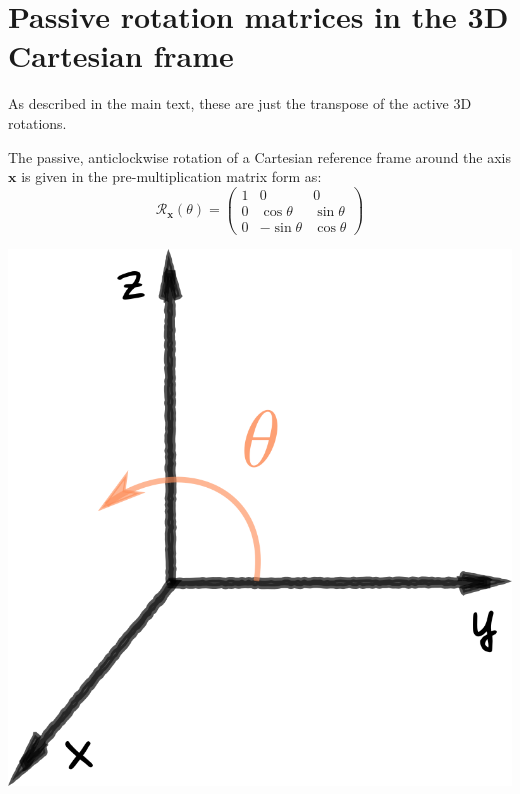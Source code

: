 \chapter{Passive rotation matrices in the 3D Cartesian frame}
\label{Chap:rotations}

As described in the  main text, these are just the transpose of the active 3D rotations.

\vspace{0.2cm}

\noindent\begin{minipage}{0.47\textwidth}
The passive, anticlockwise rotation of a Cartesian reference frame around the axis $\mathbf{x}$ is given in the pre-multiplication matrix form as: 
\begin{equation*}
\mathcal{R}_\mathbf{x}(\theta)=\begin{pmatrix}
1 &  0           & 0 \\
0 & \cos{\theta} & \sin{\theta} \\
0 & -\sin{\theta} & \cos{\theta}
\end{pmatrix}
\label{eq:RotMat}
\end{equation*}
\end{minipage}
\begin{minipage}{0.5\textwidth}
\centering
\includegraphics[width=0.45\linewidth]{Figures/Rx.png}
\end{minipage}



